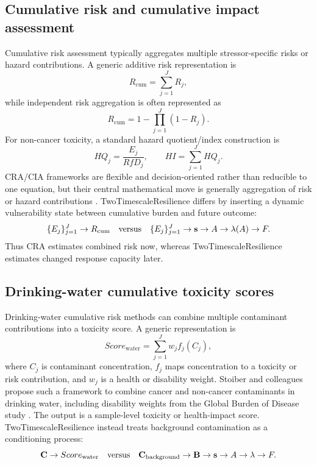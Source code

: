 \subsection{Cumulative risk and cumulative impact assessment}

Cumulative risk assessment typically aggregates multiple stressor-specific risks or hazard contributions. A generic additive risk representation is
\begin{equation}
  R_{\mathrm{cum}}=\sum_{j=1}^J R_j,
\end{equation}
while independent risk aggregation is often represented as
\begin{equation}
  R_{\mathrm{cum}}=1-\prod_{j=1}^J(1-R_j).
\end{equation}
For non-cancer toxicity, a standard hazard quotient/index construction is
\begin{equation}
  HQ_j=\frac{E_j}{RfD_j},
  \qquad
  HI=\sum_{j=1}^J HQ_j.
\end{equation}
CRA/CIA frameworks are flexible and decision-oriented rather than reducible to one equation, but their central mathematical move is generally aggregation of risk or hazard contributions \citep{epa2003cumulative,sexton2012cumulative,epa2025cumulative}. TwoTimescaleResilience differs by inserting a dynamic vulnerability state between cumulative burden and future outcome:
\begin{equation}
  \{E_j\}_{j=1}^J\rightarrow R_{\mathrm{cum}}
  \quad\hbox{versus}\quad
  \{E_j\}_{j=1}^J\rightarrow \mathbf{s}\rightarrow A\rightarrow\lambda(A)\rightarrow F.
\end{equation}
Thus CRA estimates combined risk now, whereas TwoTimescaleResilience estimates changed response capacity later.

\subsection{Drinking-water cumulative toxicity scores}

Drinking-water cumulative risk methods can combine multiple contaminant contributions into a toxicity score. A generic representation is
\begin{equation}
  Score_{\mathrm{water}}=\sum_{j=1}^J w_j f_j(C_j),
\end{equation}
where $C_j$ is contaminant concentration, $f_j$ maps concentration to a toxicity or risk contribution, and $w_j$ is a health or disability weight. Stoiber and colleagues propose such a framework to combine cancer and non-cancer contaminants in drinking water, including disability weights from the Global Burden of Disease study \citep{stoiber2019drinking}. The output is a sample-level toxicity or health-impact score. TwoTimescaleResilience instead treats background contamination as a conditioning process:
\begin{equation}
  \mathbf{C}\rightarrow Score_{\mathrm{water}}
  \quad\hbox{versus}\quad
  \mathbf{C}_{\mathrm{background}}\rightarrow \mathbf{B}\rightarrow \mathbf{s}\rightarrow A\rightarrow\lambda\rightarrow F.
\end{equation}

